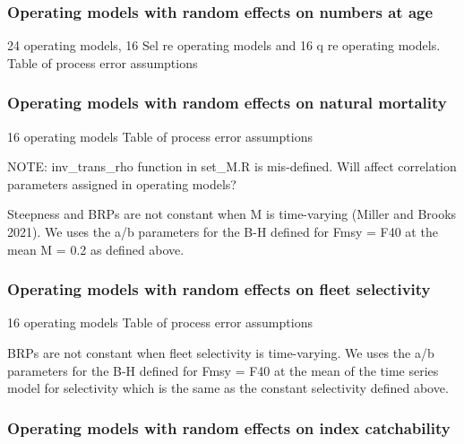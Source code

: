 \documentclass[
  12pt,
]{article}
\begin{document}
\hypertarget{operating-models-with-random-effects-on-numbers-at-age}{%
\subsubsection{Operating models with random effects on numbers at
age}\label{operating-models-with-random-effects-on-numbers-at-age}}

24 operating models, 16 Sel re operating models and 16 q re operating
models. Table of process error assumptions

\hypertarget{operating-models-with-random-effects-on-natural-mortality}{%
\subsubsection{Operating models with random effects on natural
mortality}\label{operating-models-with-random-effects-on-natural-mortality}}

16 operating models Table of process error assumptions

NOTE: inv\_trans\_rho function in set\_M.R is mis-defined. Will affect
correlation parameters assigned in operating models?

Steepness and BRPs are not constant when M is time-varying (Miller and
Brooks 2021). We uses the a/b parameters for the B-H defined for Fmsy =
F40 at the mean M = 0.2 as defined above.

\hypertarget{operating-models-with-random-effects-on-fleet-selectivity}{%
\subsubsection{Operating models with random effects on fleet
selectivity}\label{operating-models-with-random-effects-on-fleet-selectivity}}

16 operating models Table of process error assumptions

BRPs are not constant when fleet selectivity is time-varying. We uses
the a/b parameters for the B-H defined for Fmsy = F40 at the mean of the
time series model for selectivity which is the same as the constant
selectivity defined above.

\hypertarget{operating-models-with-random-effects-on-index-catchability}{%
\subsubsection{Operating models with random effects on index
catchability}\label{operating-models-with-random-effects-on-index-catchability}}
\end{document}
